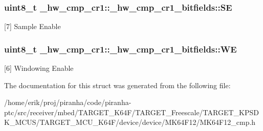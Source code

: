 \subsubsection[{\texorpdfstring{SE}{SE}}]{\setlength{\rightskip}{0pt plus 5cm}uint8\+\_\+t \+\_\+hw\+\_\+cmp\+\_\+cr1\+::\+\_\+hw\+\_\+cmp\+\_\+cr1\+\_\+bitfields\+::\+SE}\hypertarget{struct__hw__cmp__cr1_1_1__hw__cmp__cr1__bitfields_a85f2cbe81bad2ee8248f8a36a9452cac}{}\label{struct__hw__cmp__cr1_1_1__hw__cmp__cr1__bitfields_a85f2cbe81bad2ee8248f8a36a9452cac}
\mbox{[}7\mbox{]} Sample Enable 
\subsubsection[{\texorpdfstring{WE}{WE}}]{\setlength{\rightskip}{0pt plus 5cm}uint8\+\_\+t \+\_\+hw\+\_\+cmp\+\_\+cr1\+::\+\_\+hw\+\_\+cmp\+\_\+cr1\+\_\+bitfields\+::\+WE}\hypertarget{struct__hw__cmp__cr1_1_1__hw__cmp__cr1__bitfields_a0dd2ce9756e99aa9229190fe29aada77}{}\label{struct__hw__cmp__cr1_1_1__hw__cmp__cr1__bitfields_a0dd2ce9756e99aa9229190fe29aada77}
\mbox{[}6\mbox{]} Windowing Enable 

The documentation for this struct was generated from the following file\+:\begin{DoxyCompactItemize}
\item 
/home/erik/proj/piranha/code/piranha-\/ptc/src/receiver/mbed/\+T\+A\+R\+G\+E\+T\+\_\+\+K64\+F/\+T\+A\+R\+G\+E\+T\+\_\+\+Freescale/\+T\+A\+R\+G\+E\+T\+\_\+\+K\+P\+S\+D\+K\+\_\+\+M\+C\+U\+S/\+T\+A\+R\+G\+E\+T\+\_\+\+M\+C\+U\+\_\+\+K64\+F/device/device/\+M\+K64\+F12/M\+K64\+F12\+\_\+cmp.\+h\end{DoxyCompactItemize}
